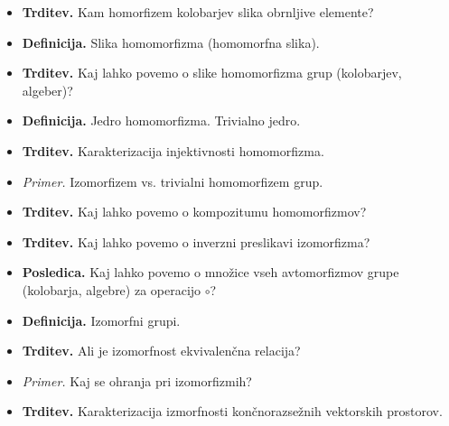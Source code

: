 \begin{enumerate}
\begin{itemize}
        \item \colorbox{blue!30}{\textbf{Trditev.}} Kam homorfizem kolobarjev slika obrnljive elemente?
        \item \colorbox{purple!30}{\textbf{Definicija.}} Slika homomorfizma (homomorfna slika).
        \item \colorbox{blue!30}{\textbf{Trditev.}} Kaj lahko povemo o slike homomorfizma grup (kolobarjev, algeber)?
        \item \colorbox{purple!30}{\textbf{Definicija.}} Jedro homomorfizma. Trivialno jedro.
        \item \colorbox{blue!30}{\textbf{Trditev.}} Karakterizacija injektivnosti homomorfizma. 
        \item \colorbox{yellow!30}{\emph{Primer.}} Izomorfizem vs. trivialni homomorfizem grup.
        \item \colorbox{blue!30}{\textbf{Trditev.}} Kaj lahko povemo o kompozitumu homomorfizmov?
        \item \colorbox{blue!30}{\textbf{Trditev.}} Kaj lahko povemo o inverzni preslikavi izomorfizma?
        \item \colorbox{orange!30}{\textbf{Posledica.}} Kaj lahko povemo o množice vseh avtomorfizmov grupe (kolobarja, algebre) za operacijo $\circ$?
        \item \colorbox{purple!30}{\textbf{Definicija.}} Izomorfni grupi.
        \item \colorbox{blue!30}{\textbf{Trditev.}} Ali je izomorfnost ekvivalenčna relacija?
        \item \colorbox{yellow!30}{\emph{Primer.}} Kaj se ohranja pri izomorfizmih?
        \item \colorbox{blue!30}{\textbf{Trditev.}} Karakterizacija izmorfnosti končnorazsežnih vektorskih prostorov.
    \end{itemize}


\end{enumerate}
